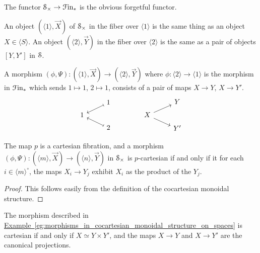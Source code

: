 \documentclass[main.tex]{subfiles}
\begin{document}
The functor $\S_{\times} \to \Finp$ is the obvious forgetful functor.

\begin{example}
  \label{eg:morphisms_in_cocartesian_monoidal_structure_on_spaces}
  An object $(\langle 1 \rangle, \vec{X})$ of $\S_{\times}$ in the fiber over $\langle 1 \rangle$ is the same thing as an object $X \in \langle S \rangle$. An object $( \langle 2 \rangle, \vec{Y})$ in the fiber over $\langle 2 \rangle$ is the same as a pair of objects $[Y, Y']$ in $\S$.

  A morphism $(\phi, \Psi)\colon (\langle 1 \rangle, \vec{X}) \to (\langle 2 \rangle, \vec{Y})$ where $\phi\colon \langle 2 \rangle \to \langle 1 \rangle$ is the morphism in $\Finp$ which sends $1 \mapsto 1$, $2 \mapsto 1$, consists of a pair of maps $X \to Y$, $X \to Y'$.
  \begin{equation*}
    \begin{tikzcd}[row sep=tiny]
      & 1
      \arrow[dl, mapsto]
      \\
      1
      \\
      & 2
      \arrow[ul, mapsto]
    \end{tikzcd}
    \qquad\qquad
    \begin{tikzcd}[row sep=tiny]
      & Y
      \\
      X
      \arrow[ur]
      \arrow[dr]
      \\
      & Y'
    \end{tikzcd}
  \end{equation*}
\end{example}

\begin{lemma}
  The map $p$ is a cartesian fibration, and a morphism $(\phi, \Psi)\colon (\langle m \rangle, \vec{X}) \to (\langle n \rangle, \vec{Y})$ in $\S_{\times}$ is $p$-cartesian if and only if it for each $i \in \langle m \rangle^{\circ}$, the maps $X_{i} \to Y_{j}$ exhibit $X_{i}$ as the product of the $Y_{j}$.
\end{lemma}
\begin{proof}
  This follows easily from the definition of the cocartesian monoidal structure.
\end{proof}

\begin{example}
  The morphism described in \hyperref[eg:morphisms_in_cocartesian_monoidal_structure_on_spaces]{Example~\ref*{eg:morphisms_in_cocartesian_monoidal_structure_on_spaces}} is cartesian if and only if $X \simeq Y \times Y'$, and the maps $X \to Y$ and $X \to Y'$ are the canonical projections.
\end{example}
\end{document}
